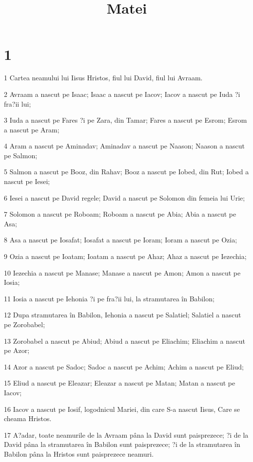 

\title{Matei}


\chapter{1}

\par 1 Cartea neamului lui Iisus Hristos, fiul lui David, fiul lui Avraam.
\par 2 Avraam a nascut pe Isaac; Isaac a nascut pe Iacov; Iacov a nascut pe Iuda ?i fra?ii lui;
\par 3 Iuda a nascut pe Fares ?i pe Zara, din Tamar; Fares a nascut pe Esrom; Esrom a nascut pe Aram;
\par 4 Aram a nascut pe Aminadav; Aminadav a nascut pe Naason; Naason a nascut pe Salmon;
\par 5 Salmon a nascut pe Booz, din Rahav; Booz a nascut pe Iobed, din Rut; Iobed a nascut pe Iesei;
\par 6 Iesei a nascut pe David regele; David a nascut pe Solomon din femeia lui Urie;
\par 7 Solomon a nascut pe Roboam; Roboam a nascut pe Abia; Abia a nascut pe Asa;
\par 8 Asa a nascut pe Iosafat; Iosafat a nascut pe Ioram; Ioram a nascut pe Ozia;
\par 9 Ozia a nascut pe Ioatam; Ioatam a nascut pe Ahaz; Ahaz a nascut pe Iezechia;
\par 10 Iezechia a nascut pe Manase; Manase a nascut pe Amon; Amon a nascut pe Iosia;
\par 11 Iosia a nascut pe Iehonia ?i pe fra?ii lui, la stramutarea în Babilon;
\par 12 Dupa stramutarea în Babilon, Iehonia a nascut pe Salatiel; Salatiel a nascut pe Zorobabel;
\par 13 Zorobabel a nascut pe Abiud; Abiud a nascut pe Eliachim; Eliachim a nascut pe Azor;
\par 14 Azor a nascut pe Sadoc; Sadoc a nascut pe Achim; Achim a nascut pe Eliud;
\par 15 Eliud a nascut pe Eleazar; Eleazar a nascut pe Matan; Matan a nascut pe Iacov;
\par 16 Iacov a nascut pe Iosif, logodnicul Mariei, din care S-a nascut Iisus, Care se cheama Hristos.
\par 17 A?adar, toate neamurile de la Avraam pâna la David sunt paisprezece; ?i de la David pâna la stramutarea în Babilon sunt paisprezece; ?i de la stramutarea în Babilon pâna la Hristos sunt paisprezece neamuri.
